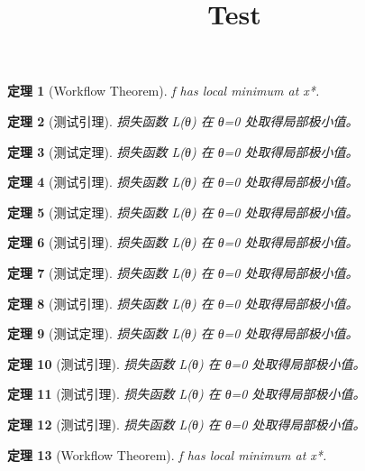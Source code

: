 \documentclass{article}
\title{Test}
\newtheorem{theorem}{定理}
\begin{document}
\maketitle
\begin{theorem}[Workflow Theorem]
f has local minimum at x*.
\end{theorem}

\begin{theorem}[测试引理]
损失函数 L(θ) 在 θ=0 处取得局部极小值。
\end{theorem}

\begin{theorem}[测试定理]
损失函数 L(θ) 在 θ=0 处取得局部极小值。
\end{theorem}

\begin{theorem}[测试引理]
损失函数 L(θ) 在 θ=0 处取得局部极小值。
\end{theorem}

\begin{theorem}[测试定理]
损失函数 L(θ) 在 θ=0 处取得局部极小值。
\end{theorem}

\begin{theorem}[测试引理]
损失函数 L(θ) 在 θ=0 处取得局部极小值。
\end{theorem}

\begin{theorem}[测试定理]
损失函数 L(θ) 在 θ=0 处取得局部极小值。
\end{theorem}

\begin{theorem}[测试引理]
损失函数 L(θ) 在 θ=0 处取得局部极小值。
\end{theorem}

\begin{theorem}[测试定理]
损失函数 L(θ) 在 θ=0 处取得局部极小值。
\end{theorem}

\begin{theorem}[测试引理]
损失函数 L(θ) 在 θ=0 处取得局部极小值。
\end{theorem}

\begin{theorem}[测试引理]
损失函数 L(θ) 在 θ=0 处取得局部极小值。
\end{theorem}

\begin{theorem}[测试引理]
损失函数 L(θ) 在 θ=0 处取得局部极小值。
\end{theorem}

\begin{theorem}[Workflow Theorem]
f has local minimum at x*.
\end{theorem}
\end{document}
